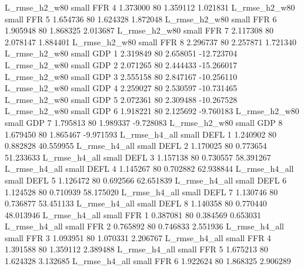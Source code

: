  L_rmse_h2_w80      small      FFR                 4 1.373000 80       1.359112           1.021831
 L_rmse_h2_w80      small      FFR                 5 1.654736 80       1.624328           1.872048
 L_rmse_h2_w80      small      FFR                 6 1.905948 80       1.868325           2.013687
 L_rmse_h2_w80      small      FFR                 7 2.117308 80       2.078147           1.884401
 L_rmse_h2_w80      small      FFR                 8 2.296737 80       2.257871           1.721340
 L_rmse_h2_w80      small      GDP                 1 2.319849 80       2.658051         -12.723704
 L_rmse_h2_w80      small      GDP                 2 2.071265 80       2.444433         -15.266017
 L_rmse_h2_w80      small      GDP                 3 2.555158 80       2.847167         -10.256110
 L_rmse_h2_w80      small      GDP                 4 2.259027 80       2.530597         -10.731465
 L_rmse_h2_w80      small      GDP                 5 2.072361 80       2.309488         -10.267528
 L_rmse_h2_w80      small      GDP                 6 1.918221 80       2.125692          -9.760183
 L_rmse_h2_w80      small      GDP                 7 1.795813 80       1.989337          -9.728083
 L_rmse_h2_w80      small      GDP                 8 1.679450 80       1.865467          -9.971593
 L_rmse_h4_all      small     DEFL                 1 1.240902 80       0.882828          40.559955
 L_rmse_h4_all      small     DEFL                 2 1.170025 80       0.773654          51.233633
 L_rmse_h4_all      small     DEFL                 3 1.157138 80       0.730557          58.391267
 L_rmse_h4_all      small     DEFL                 4 1.145267 80       0.702882          62.938844
 L_rmse_h4_all      small     DEFL                 5 1.126472 80       0.692566          62.651839
 L_rmse_h4_all      small     DEFL                 6 1.124528 80       0.710939          58.175020
 L_rmse_h4_all      small     DEFL                 7 1.130746 80       0.736877          53.451133
 L_rmse_h4_all      small     DEFL                 8 1.140358 80       0.770440          48.013946
 L_rmse_h4_all      small      FFR                 1 0.387081 80       0.384569           0.653031
 L_rmse_h4_all      small      FFR                 2 0.765892 80       0.746833           2.551936
 L_rmse_h4_all      small      FFR                 3 1.093951 80       1.070331           2.206767
 L_rmse_h4_all      small      FFR                 4 1.391588 80       1.359112           2.389488
 L_rmse_h4_all      small      FFR                 5 1.675213 80       1.624328           3.132685
 L_rmse_h4_all      small      FFR                 6 1.922624 80       1.868325           2.906289
